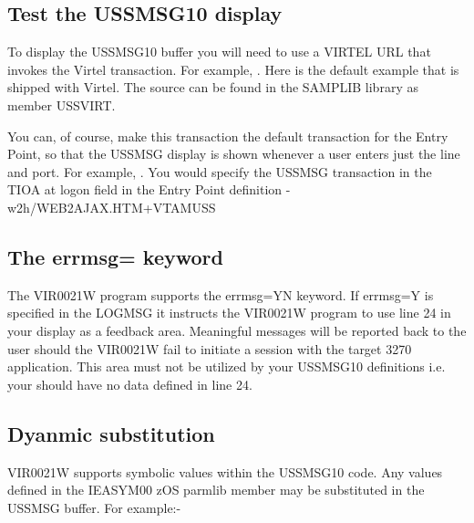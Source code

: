 \documentclass[letterpaper,10pt,english]{sphinxmanual}
\begin{document}
\subsection{Test the USSMSG10 display}
\label{\detokenize{Customization:test-the-ussmsg10-display}}
To display the USSMSG10 buffer you will need to use a VIRTEL URL that invokes the Virtel transaction. For example, . Here is the default example that is shipped with Virtel. The source can be found in the SAMPLIB library as member USSVIRT.



You can, of course, make this transaction the default transaction for the Entry Point, so that the USSMSG display is shown whenever a user enters just the line and port. For example, . You would specify the USSMSG transaction in the TIOA at logon field in the Entry Point definition - w2h/WEB2AJAX.HTM+VTAMUSS


\subsection{The errmsg= keyword}
\label{\detokenize{Customization:the-errmsg-keyword}}
The VIR0021W program supports the errmsg=Y\textbar{}N keyword. If errmsg=Y is specified in the LOGMSG it instructs the VIR0021W program to use line 24 in your display as a feedback area. Meaningful messages will be reported back to the user should the VIR0021W fail to initiate a session with the target 3270 application. This area must not be utilized by your USSMSG10 definitions i.e. your should have no data defined in line 24.


\subsection{Dyanmic substitution}
\label{\detokenize{Customization:dyanmic-substitution}}
VIR0021W supports symbolic values within the USSMSG10 code. Any values defined in the IEASYM00 zOS parmlib member may be substituted in the USSMSG buffer. For example:-

\begin{sphinxVerbatim}[commandchars=\\\{\}]
 
\end{sphinxVerbatim}
\end{document}
